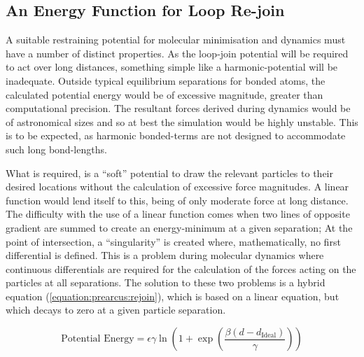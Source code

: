 \subsection{An Energy Function for Loop Re-join}
\label{section:prearcus:rejoin_force}

A suitable restraining potential for molecular minimisation and dynamics must have a number of distinct properties. As the loop-join potential will be required to act over long distances, something simple like a harmonic-potential will be inadequate. Outside typical equilibrium separations for bonded atoms, the calculated potential energy would be of excessive magnitude, greater than computational precision.  The resultant forces derived during dynamics would be of astronomical sizes and so at best the simulation would be highly unstable. This is to be expected, as harmonic bonded-terms are not designed to accommodate such long bond-lengths.

What is required, is a ``soft'' potential to draw the relevant particles to their desired locations without the calculation of excessive force magnitudes. A linear function would lend itself to this, being of only moderate force at long distance. The difficulty with the use of a linear function comes when two lines of opposite gradient are summed to create an energy-minimum at a given separation; At the point of intersection, a ``singularity'' is created where, mathematically, no first differential is defined. This is a problem during molecular dynamics where continuous differentials are required for the calculation of the forces acting on the particles at all separations. The solution to these two problems is a hybrid equation (\ref{equation:prearcus:rejoin}), which is based on a linear equation, but which decays to zero at a given particle separation. 

\begin{equation}
\text{Potential Energy} = \epsilon\gamma\ln\left(1+\exp\left(\frac{\beta\left( d - d_{\text{Ideal}} \right)}{\gamma}\right)\right)
\label{equation:prearcus:rejoin}
\end{equation}

